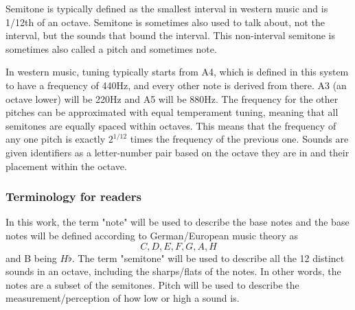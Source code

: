 Semitone is typically defined as the smallest interval in western music and is 1/12th of an octave. Semitone is sometimes also used to talk about, not the interval, but the sounds that bound the interval. This non-interval semitone is sometimes also called a pitch and sometimes note.

In western music, tuning typically starts from A4, which is defined in this system to have a frequency of 440Hz, and every other note is derived from there. A3 (an octave lower) will be 220Hz and A5 will be 880Hz. The frequency for the other pitches can be approximated with equal temperament tuning, meaning that all semitones are equally spaced within octaves. This means that the frequency of any one pitch is exactly $2^{1/12}$ times the frequency of the previous one. Sounds are given identifiers as a letter-number pair based on the octave they are in and their placement within the octave. 

\subsubsection{Terminology for readers}
In this work, the term "note" will be used to describe the base notes and the base notes will be defined according to German/European music theory as \[C, D, E, F, G, A, H\] and B being $H\flat$. The term "semitone" will be used to describe all the 12 distinct sounds in an octave, including the sharps/flats of the notes. In other words, the notes are a subset of the semitones. Pitch will be used to describe the measurement/perception of how low or high a sound is. 

% 
